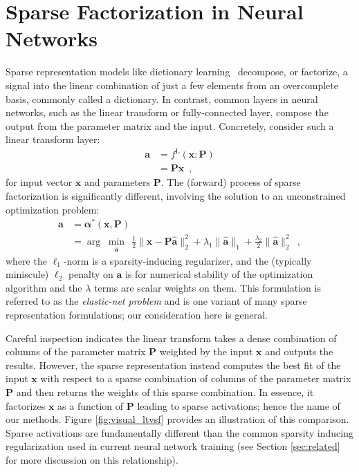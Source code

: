 \documentclass[10pt,twocolumn,letterpaper]{article}
\newcommand{\mnmz}[1][]{\ensuremath{\underset{#1}{\text{min}}\:\:}}
\newcommand{\argmnmz}[1][]{\ensuremath{\arg\;\underset{#1}{\min}\:\:}}
\renewcommand{\vec}{\mathbf}
\newcommand{\x}{\vec{x}}
\newcommand{\D}{\vec{D}}
\renewcommand{\P}{\vec{P}}
\renewcommand{\a}{\vec{a}}
\newcommand{\balpha}{\boldsymbol{\alpha}}
\begin{document}
\section{Sparse Factorization in Neural Networks}
\label{sec:sparsemain}


Sparse representation models like dictionary learning~\cite{ElBOOK2010} decompose, or 
factorize, a signal into the linear combination of just a few elements from an 
overcomplete basis, commonly called a dictionary.  In contrast, common layers 
in neural networks, such as the linear transform or fully-connected layer, 
compose the output from the parameter matrix and the input.  Concretely, 
consider such a linear transform layer: 
%
\begin{align}
    \a & = f^{\text{L}}(\x;\P) \nonumber\\
       & = \P\x \enspace,
\end{align}
%
\noindent for input vector $\x$ and parameters $\P$.  
%
The (forward) process of sparse factorization is significantly different, involving the solution to an unconstrained optimization problem:
\begin{align}
    \a & = \balpha^*(\x,\P)
\label{eq:sp_coding}
    \\ 
    & = \argmnmz[\hat{\a}] \frac{1}{2}  \lVert \x-\P\hat{\a}\rVert_2^2 +
      \lambda_1\lVert\hat{\a}\rVert_1+\frac{\lambda_2}{2}\lVert\hat{\a}\rVert_2^2
\enspace, \nonumber
\end{align}
%
\noindent 
where the $\ell_1$-norm is a sparsity-inducing regularizer, and the (typically miniscule) $\ell_2$ penalty on $\a$ is for numerical stability of the optimization algorithm and the $\lambda$ terms are scalar weights on them.    This formulation is referred to as the \textit{elastic-net problem} \cite{ZoHaJRSS2005} and is one variant of many sparse representation formulations; our consideration here is general. 

Careful inspection indicates the linear transform takes a dense combination of columns of the parameter matrix $\P$ weighted by the input $\x$ and outputs the results.  However, the sparse representation instead computes the best fit of the input $\x$ with respect to a sparse combination of columns of the parameter matrix $\P$ and then returns the weights of this sparse combination.  In essence, it factorizes $\x$ as a function of $\P$ leading to sparse activations; hence the name of our methods.  
%
Figure \ref{fig:visual_ltvsf} provides an illustration of this comparison.  
%
Sparse activations are fundamentally different than the common sparsity inducing regularization used in current neural network training (see Section \ref{sec:related} for more discussion on this relationship).
%
\end{document}
